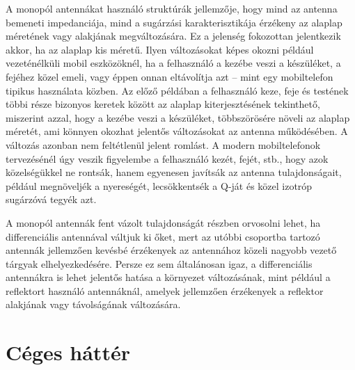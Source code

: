 \par A monopól antennákat használó struktúrák jellemzője, hogy mind az antenna bemeneti impedanciája, mind a sugárzási karakterisztikája érzékeny az alaplap méretének vagy alakjának megváltozására. Ez a jelenség fokozottan jelentkezik akkor, ha az alaplap kis méretű. Ilyen változásokat képes okozni például vezeténélküli mobil eszközöknél, ha a felhasználó a kezébe veszi a készüléket, a fejéhez közel emeli, vagy éppen onnan eltávolítja azt -- mint egy mobiltelefon tipikus használata közben. Az előző példában a felhasználó keze, feje és testének többi része bizonyos keretek között az alaplap kiterjesztésének tekinthető, miszerint azzal, hogy a kezébe veszi a készüléket, többszörösére növeli az alaplap méretét, ami könnyen okozhat jelentős változásokat az antenna működésében. A változás azonban nem feltétlenül jelent romlást. A modern mobiltelefonok tervezésénél úgy veszik figyelembe a felhasználó kezét, fejét, stb., hogy azok közelségükkel ne rontsák, hanem egyenesen javítsák az antenna tulajdonságait, például megnöveljék a nyereségét, lecsökkentsék a Q-ját és közel izotróp sugárzóvá tegyék azt.
\par A monopól antennák fent vázolt tulajdonságát részben orvosolni lehet, ha differenciális antennával váltjuk ki őket, mert az utóbbi csoportba tartozó antennák jellemzően kevésbé érzékenyek az antennához közeli nagyobb vezető tárgyak elhelyezkedésére. Persze ez sem általánosan igaz, a differenciális antennákra is lehet jelentős hatása a környezet változásának, mint például a reflektort használó antennáknál, amelyek jellemzően érzékenyek a reflektor alakjának vagy távolságának változására.
\section{Céges háttér}

